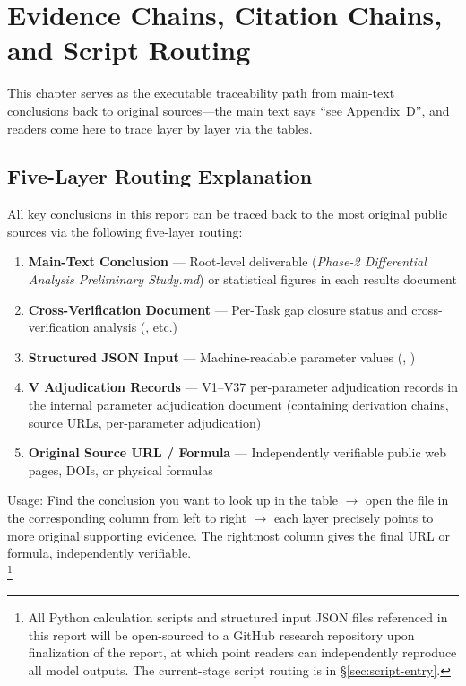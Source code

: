 
\section{Evidence Chains, Citation Chains, and Script Routing}

This chapter serves as the executable traceability path from main-text conclusions back to original sources---the main text says ``see Appendix~D'', and readers come here to trace layer by layer via the tables.

\subsection{Five-Layer Routing Explanation}
\label{sec:five-layer}

All key conclusions in this report can be traced back to the most original public sources via the following five-layer routing:

\begin{enumerate}
  \item \textbf{Main-Text Conclusion} --- Root-level deliverable (\textit{Phase-2 Differential Analysis Preliminary Study.md}) or statistical figures in each results document
  \item \textbf{Cross-Verification Document} --- Per-Task gap closure status and cross-verification analysis (, etc.)
  \item \textbf{Structured JSON Input} --- Machine-readable parameter values (, )
  \item \textbf{V Adjudication Records} --- V1--V37 per-parameter adjudication records in the internal parameter adjudication document (containing derivation chains, source URLs, per-parameter adjudication)
  \item \textbf{Original Source URL / Formula} --- Independently verifiable public web pages, DOIs, or physical formulas
\end{enumerate}

Usage: Find the conclusion you want to look up in the table $\to$ open the file in the corresponding column from left to right $\to$ each layer precisely points to more original supporting evidence. The rightmost column gives the final URL or formula, independently verifiable.\\[4pt]
\footnote{All Python calculation scripts and structured input JSON files referenced in this report will be open-sourced to a GitHub research repository upon finalization of the report, at which point readers can independently reproduce all model outputs. The current-stage script routing is in \S\ref{sec:script-entry}.}

